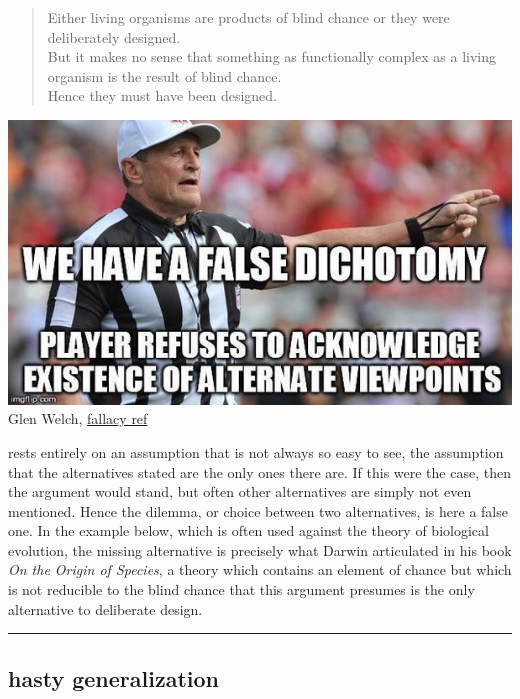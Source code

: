 \documentclass[justified]{tufte-book}
\newenvironment{argument}{\begin{quote}\normalsize}{\end{quote}}
\begin{document}
\begin{argument}
Either living organisms are products of blind chance or they were
deliberately designed.\\
But it makes no sense that something as functionally complex as a living
organism is the result of blind chance.\\
Hence they must have been designed.
\end{argument}

\begin{marginfigure}
\includegraphics{img/fallacies/dichotomy.jpg}\\
Glen Welch, \href{https://twitter.com/fallacy_ref?lang=en}{fallacy ref}
\end{marginfigure}

 rests entirely on an assumption that is not always so easy to see, the assumption that the alternatives stated are the only ones there are. If this were the case, then the argument would stand, but often other alternatives are simply not even mentioned. Hence the dilemma, or choice between two alternatives, is here a false one. In the example below, which is often used against the theory of biological evolution, the missing alternative is precisely what Darwin articulated in his book \emph{On the Origin of Species}, a theory which contains an element of chance but which is not reducible to the blind chance that this argument presumes is the only alternative to deliberate design.

\begin{center}\rule{0.5\linewidth}{\linethickness}\end{center}

\hypertarget{hasty-generalization}{%
\subsection*{hasty generalization}\label{hasty-generalization}}
\end{document}
